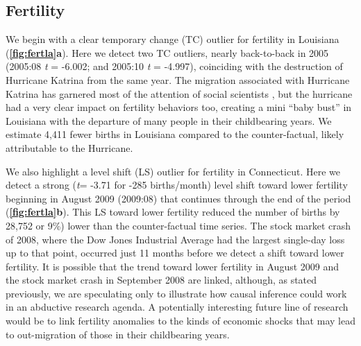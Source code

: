 \documentclass[12pt]{article}
\begin{document}
\hypertarget{fertility}{%
\subsection{Fertility}\label{fertility}}

We begin with a clear temporary change (TC) outlier for fertility in
Louisiana (\textbf{\autoref{fig:fertla}a}). Here we detect two TC
outliers, nearly back-to-back in 2005 (2005:08 \emph{t} = -6.002; and
2005:10 \emph{t} = -4.997), coinciding with the destruction of Hurricane
Katrina from the same year. The migration associated with Hurricane
Katrina has garnered most of the attention of social scientists
\citep{fussellRecoveryMigrationCity2014, horiDisplacementDynamicsSouthern2009},
but the hurricane had a very clear impact on fertility behaviors too,
creating a mini ``baby bust'' in Louisiana with the departure of many
people in their childbearing years. We estimate 4,411 fewer births in
Louisiana compared to the counter-factual, likely attributable to the
Hurricane.

We also highlight a level shift (LS) outlier for fertility in
Connecticut. Here we detect a strong (\emph{t}= -3.71 for -285
births/month) level shift toward lower fertility beginning in August
2009 (2009:08) that continues through the end of the period
(\textbf{\autoref{fig:fertla}b}). This LS toward lower fertility reduced
the number of births by 28,752 or 9\%) lower than the counter-factual
time series. The stock market crash of 2008, where the Dow Jones
Industrial Average had the largest single-day loss up to that point,
occurred just 11 months before we detect a shift toward lower fertility.
It is possible that the trend toward lower fertility in August 2009 and
the stock market crash in September 2008 are linked, although, as stated
previously, we are speculating only to illustrate how causal inference
could work in an abductive research agenda. A potentially interesting
future line of research would be to link fertility anomalies to the
kinds of economic shocks that may lead to out-migration of those in
their childbearing years.
\end{document}
